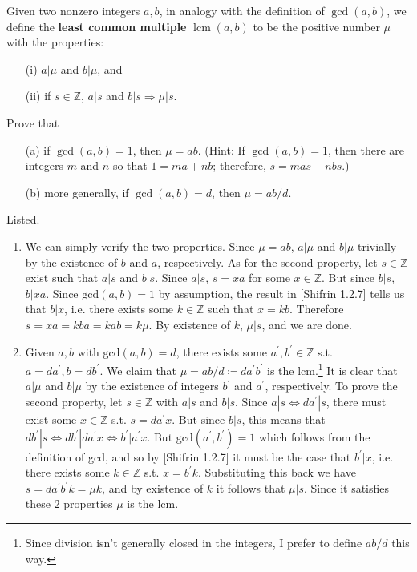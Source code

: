   \begin{exercise}[Shifrin 1.2.13]
    Given two nonzero integers $a, b$, in analogy with the definition of $\gcd(a, b)$, we define the \textbf{least common multiple} $\operatorname{lcm}(a, b)$ to be the positive number $\mu$ with the properties:
    \begin{enumerate}
      \item[(i)] $a|\mu$ and $b|\mu$, and
      \item[(ii)] if $s \in \mathbb{Z}$, $a|s$ and $b|s \Rightarrow \mu|s$.
    \end{enumerate}
    Prove that
    \begin{enumerate}
      \item[(a)] if $\gcd(a, b) = 1$, then $\mu = ab$. (Hint: If $\gcd(a, b) = 1$, then there are integers $m$ and $n$ so that $1 = ma + nb$; therefore, $s = mas + nbs$.)
      \item[(b)] more generally, if $\gcd(a, b) = d$, then $\mu = ab/d$.
    \end{enumerate}
  \end{exercise}
  \begin{solution}
    Listed. 
    \begin{enumerate}
      \item We can simply verify the two properties. Since $\mu = ab$, $a | \mu$ and $b | \mu$ trivially by the existence of $b$ and $a$, respectively. As for the second property, let $s \in \mathbb{Z}$ exist such that $a | s$ and $b | s$. Since $a | s$, $s = xa$ for some $x \in \mathbb{Z}$. But since $b | s$, $b | xa$. Since $\mathrm{gcd}(a, b) = 1$ by assumption, the result in [Shifrin 1.2.7] tells us that $b | x$, i.e. there exists some $k \in \mathbb{Z}$ such that $x = kb$. Therefore $s = xa = kba = kab = k \mu$. By existence of $k$, $\mu | s$, and we are done. 
      \item Given $a, b$ with $\mathrm{gcd}(a, b) = d$, there exists some $a^\prime, b^\prime \in \mathbb{Z}$ s.t. $a = da^\prime, b = db^\prime$. We claim that $\mu = ab/d \coloneqq d a^\prime b^\prime$ is the lcm.\footnote{Since division isn't generally closed in the integers, I prefer to define $ab/d$ this way.} It is clear that $a | \mu$ and $b | \mu$ by the existence of integers $b^\prime$ and $a^\prime$, respectively. To prove the second property, let $s \in \mathbb{Z}$ with $a | s$ and $b | s$. Since $a | s \iff d a^\prime | s$, there must exist some $x \in \mathbb{Z}$ s.t. $s = d a^\prime x$. But since $b | s$, this means that $d b^\prime | s \iff d b^\prime | d a^\prime x \iff b^\prime | a^\prime x$. But $\mathrm{gcd}(a^\prime, b^\prime) = 1$ which follows from the definition of gcd, and so by [Shifrin 1.2.7] it must be the case that $b^\prime | x$, i.e. there exists some $k \in \mathbb{Z}$ s.t. $x = b^\prime k$. Substituting this back we have $s = d a^\prime b^\prime k = \mu k$, and by existence of $k$ it follows that $\mu | s$. Since it satisfies these 2 properties $\mu$ is the lcm. 
    \end{enumerate}
  \end{solution} 

